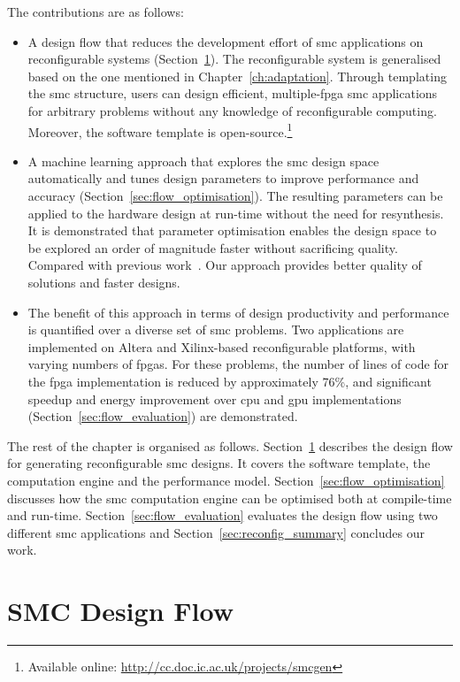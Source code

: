 The contributions are as follows:
\begin{itemize}
\item A design flow that reduces the development effort of \gls{smc} applications on reconfigurable systems (Section~\ref{sec:flow_design}).
The reconfigurable system is generalised based on the one mentioned in Chapter~\ref{ch:adaptation}.
Through templating the \gls{smc} structure, users can design efficient, multiple-\gls{fpga} \gls{smc} applications for arbitrary problems without any knowledge of reconfigurable computing.
Moreover, the software template is open-source.\footnote{Available online: \url{http://cc.doc.ic.ac.uk/projects/smcgen}}
\item A machine learning approach that explores the \gls{smc} design space automatically and tunes design parameters to improve performance and accuracy (Section~\ref{sec:flow_optimisation}). The resulting parameters can be applied to the hardware design at run-time without the need for resynthesis.
It is demonstrated that parameter optimisation enables the design space to be explored an order of magnitude faster without sacrificing quality.
Compared with previous work~\cite{chau14trets,chau13acm}.
Our approach provides better quality of solutions and faster designs.
\item The benefit of this approach in terms of design productivity and performance is quantified over a diverse set of \gls{smc} problems.
Two applications are implemented on Altera and Xilinx-based reconfigurable platforms, with varying numbers of \glspl{fpga}. For these problems, the number of lines of code for the \gls{fpga} implementation is reduced by approximately 76\%, and 
significant speedup and energy improvement over \gls{cpu} and \gls{gpu} implementations (Section~\ref{sec:flow_evaluation}) are demonstrated.
\end{itemize}

The rest of the chapter is organised as follows.
Section~\ref{sec:flow_design} describes the design flow for generating reconfigurable \gls{smc} designs.
It covers the software template, the computation engine and the performance model.
Section~\ref{sec:flow_optimisation} discusses how the \gls{smc} computation engine can be optimised both at compile-time and run-time.
Section~\ref{sec:flow_evaluation} evaluates the design flow using two different \gls{smc} applications and 
Section~\ref{sec:reconfig_summary} concludes our work.


\section{SMC Design Flow}
\label{sec:flow_design}

